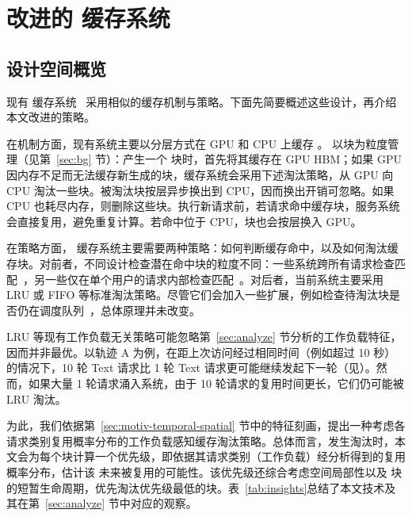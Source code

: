 \section{改进的 {\kvcache} 缓存系统}
\label{sec:design}

\subsection{设计空间概览}
\label{sec:design-mechanism}

现有 {\kvcache} 缓存系统~\cite{cachedattention,vllm,sglang,DBLP:journals/corr/abs-2403-14401} 采用相似的缓存机制与策略。下面先简要概述这些设计，再介绍本文改进的策略。

在机制方面，现有系统主要以分层方式在 GPU 和 CPU 上缓存 {\kvcache}。{\kvcache} 以块为粒度管理（见第~\ref{sec:bg} 节）：产生一个 {\kvcache} 块时，首先将其缓存在 GPU HBM；如果 GPU 因内存不足而无法缓存新生成的块，缓存系统会采用下述淘汰策略，从 GPU 向 CPU 淘汰一些块。被淘汰块按层异步换出到 CPU，因而换出开销可忽略。如果 CPU 也耗尽内存，则删除这些块。执行新请求前，若请求命中缓存块，服务系统会直接复用，避免重复计算。若命中位于 CPU，块也会按层换入 GPU。

在策略方面，{\kvcache} 缓存系统主要需要两种策略：如何判断缓存命中，以及如何淘汰缓存块。对前者，不同设计检查潜在命中块的粒度不同：一些系统跨所有请求检查匹配~\cite{sglang,DBLP:journals/corr/abs-2404-12457}，另一些仅在单个用户的请求内部检查匹配~\cite{DBLP:journals/corr/abs-2403-14401,cachedattention}。对后者，当前系统主要采用 LRU 或 FIFO 等标准淘汰策略。尽管它们会加入一些扩展，例如检查待淘汰块是否仍在调度队列~\cite{cachedattention}，总体原理并未改变。

LRU 等现有工作负载无关策略可能忽略第~\ref{sec:analyze} 节分析的工作负载特征，因而并非最优。以轨迹 A 为例，在距上次访问经过相同时间（例如超过 10 秒）的情况下，10 轮 Text 请求比 1 轮 Text 请求更可能继续发起下一轮（见）。然而，如果大量 1 轮请求涌入系统，由于 10 轮请求的复用时间更长，它们仍可能被 LRU 淘汰。



为此，我们依据第~\ref{sec:motiv-temporal-spatial} 节中的特征刻画，提出一种考虑各请求类别复用概率分布的工作负载感知缓存淘汰策略。总体而言，发生淘汰时，本文会为每个块计算一个优先级，即依据其请求类别（工作负载）经分析得到的复用概率分布，估计该 {\kvcache} 未来被复用的可能性。该优先级还综合考虑空间局部性以及 {\kvcache} 块的短暂生命周期，优先淘汰优先级最低的块。表~\ref{tab:insights}总结了本文技术及其在第~\ref{sec:analyze} 节中对应的观察。

